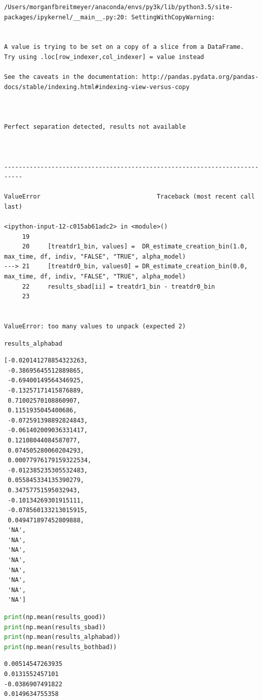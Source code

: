 \begin{lstlisting}
/Users/morganfbreitmeyer/anaconda/envs/py3k/lib/python3.5/site-packages/ipykernel/__main__.py:20: SettingWithCopyWarning:


A value is trying to be set on a copy of a slice from a DataFrame.
Try using .loc[row_indexer,col_indexer] = value instead

See the caveats in the documentation: http://pandas.pydata.org/pandas-docs/stable/indexing.html#indexing-view-versus-copy



Perfect separation detected, results not available



---------------------------------------------------------------------------

ValueError                                Traceback (most recent call last)

<ipython-input-12-c015ab61adc2> in <module>()
     19 
     20     [treatdr1_bin, values] =  DR_estimate_creation_bin(1.0, max_time, df, indiv, "FALSE", "TRUE", alpha_model)
---> 21     [treatdr0_bin, values0] = DR_estimate_creation_bin(0.0, max_time, df, indiv, "FALSE", "TRUE", alpha_model)
     22     results_sbad[ii] = treatdr1_bin - treatdr0_bin
     23 


ValueError: too many values to unpack (expected 2)
\end{lstlisting}

\begin{lstlisting}[language=Python]
results_alphabad
\end{lstlisting}

\begin{lstlisting}
[-0.020141278854323263,
 -0.38695645512889865,
 -0.69400149564346925,
 -0.13257171415876889,
 0.71002570108860907,
 0.1151935045400686,
 -0.072591398892824843,
 -0.061402009036331417,
 0.12108044084587077,
 0.074505280060204293,
 0.00077976179159322534,
 -0.012385235305532483,
 0.055845334135390279,
 0.34757751595032943,
 -0.10134269301915111,
 -0.078560133213015915,
 0.049471897452809888,
 'NA',
 'NA',
 'NA',
 'NA',
 'NA',
 'NA',
 'NA',
 'NA']
\end{lstlisting}

\begin{lstlisting}[language=Python]
print(np.mean(results_good))
print(np.mean(results_sbad))
print(np.mean(results_alphabad))
print(np.mean(results_bothbad))
\end{lstlisting}

\begin{lstlisting}
0.00514547263935
0.0131552457101
-0.0386907491822
0.0149634755358
\end{lstlisting}

